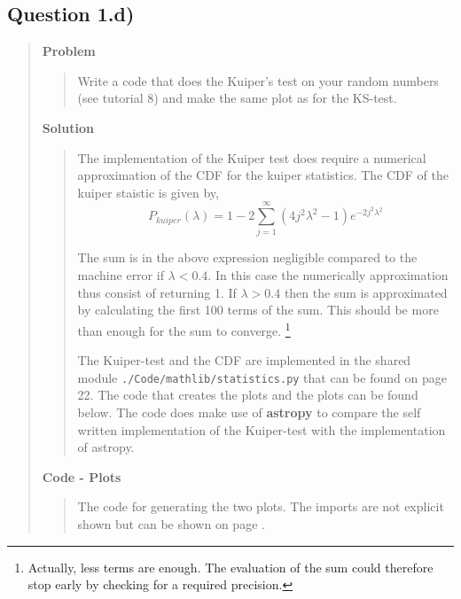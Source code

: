 \subsection*{\textbf{Question 1.d)}}
\begin{quote}

\textbf{Problem}
\begin{quote}
Write a code that does the Kuiper’s test on your random numbers (see tutorial
8) and make the same plot as for the KS-test.
\end{quote}

\textbf{Solution} 
\begin{quote}
The implementation of the Kuiper test does require a numerical approximation of the CDF for the kuiper statistics. The CDF of the kuiper staistic is given by, 
\begin{equation}
P_{kuiper}( \lambda) =  1 - 2  \sum_{j=1}^{\infty} (4j^2 \lambda^2-1) e^{-2j^2 \lambda^2 }
\end{equation}

The sum is in the above expression negligible compared to the machine error if $\lambda < 0.4$. In this case the numerically approximation thus consist of returning 1.  If $\lambda > 0.4$ then the sum is approximated by calculating the first 100 terms of the sum. This should be more than enough for the sum to converge. \footnote{Actually, less terms are enough. The evaluation of the sum could therefore stop early by checking for a required precision. } 

The Kuiper-test and the CDF are implemented in the shared module \texttt{./Code/mathlib/statistics.py} that can be found on page 22. The code that creates the plots and the plots can be found below.  The code does make use of \textbf{astropy} to compare the self written implementation of the Kuiper-test with the implementation of astropy. 
\end{quote}

\textbf{Code - Plots}

\begin{quote}
The code for generating the two plots. The imports are not explicit shown but can be shown on page \pageref{CODE:MAIN1}. 

\end{quote}


\end{quote}
